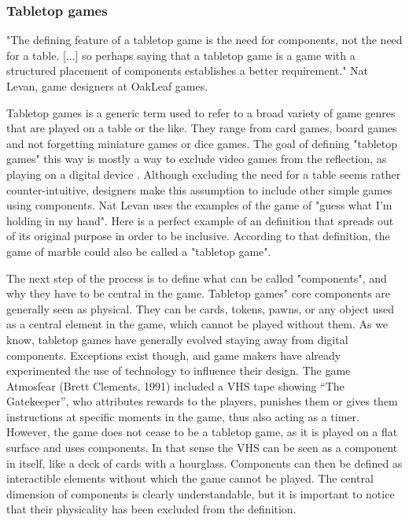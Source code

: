 \subsubsection{Tabletop games}

"The defining feature of a tabletop game is the need for components, not the need for a table. [...] so perhaps saying that a tabletop game is a game with a structured placement of components establishes a better requirement." Nat Levan, game designers at OakLeaf games.

Tabletop games is a generic term used to refer to a broad variety of game genres that are played on a table or the like. They range from card games, board games and not forgetting miniature games or dice games. The goal of defining "tabletop games" this way is mostly a way to exclude video games from the reflection, as playing on a digital device . Although excluding the need for a table seems rather counter-intuitive, designers make this assumption to include other simple games using components. Nat Levan uses the examples of the game of "guess what I'm holding in my hand". Here is a perfect example of an definition that spreads out of its original purpose in order to be inclusive. According to that definition, the game of marble could also be called a "tabletop game". 

The next step of the process is to define what can be called "components", and why they have to be central in the game. Tabletop games" core components are generally seen as physical. They can be cards, tokens, pawns, or any object used as a central element in the game, which cannot be played without them.  As we know, tabletop games have generally evolved staying away from digital components. Exceptions exist though, and game makers have already experimented the use of technology to influence their design. The game Atmosfear (Brett Clements, 1991) included a VHS tape showing “The Gatekeeper”, who attributes rewards to the players, punishes them or gives them instructions at specific moments in the game, thus also acting as a timer. However, the game does not cease to be a tabletop game, as it is played on a flat surface and uses components. In that sense the VHS can be seen as a component in itself, like a deck of cards with a hourglass. 
Components can then be defined as interactible elements without which the game cannot be played. The central dimension of components is clearly understandable, but it is important to notice that their physicality has been excluded from the definition.

